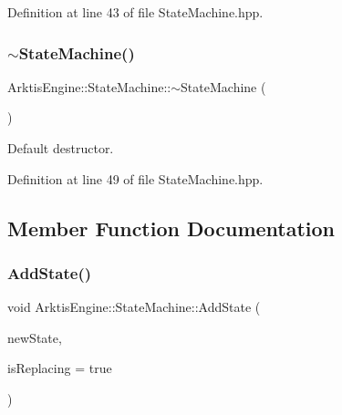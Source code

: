 \begin{DoxyVerb}\end{DoxyVerb}
 

Definition at line 43 of file State\+Machine.\+hpp.


\begin{DoxyCode}{0}

\end{DoxyCode}
\mbox{\label{class_arktis_engine_1_1_state_machine_a06a79046673c4e0810ea75044f7c833a}} 
\subsubsection{\texorpdfstring{$\sim$StateMachine()}{~StateMachine()}}
{\footnotesize\ttfamily Arktis\+Engine\+::\+State\+Machine\+::$\sim$\+State\+Machine (\begin{DoxyParamCaption}{ }\end{DoxyParamCaption})\hspace{0.3cm}{\ttfamily [inline]}}



Default destructor. 

\begin{DoxyVerb}\end{DoxyVerb}
 

Definition at line 49 of file State\+Machine.\+hpp.


\begin{DoxyCode}{0}

\end{DoxyCode}


\subsection{Member Function Documentation}
\mbox{\label{class_arktis_engine_1_1_state_machine_ab9c7ff35ffee13eecfa31436d8158a0f}} 
\subsubsection{\texorpdfstring{AddState()}{AddState()}}
{\footnotesize\ttfamily void Arktis\+Engine\+::\+State\+Machine\+::\+Add\+State (\begin{DoxyParamCaption}\item[{\mbox{\hyperlink{namespace_arktis_engine_a2df871316f5a55f656d888e1ab2f4531}{State\+Ref}}}]{new\+State,  }\item[{bool}]{is\+Replacing = {\ttfamily true} }\end{DoxyParamCaption})}



